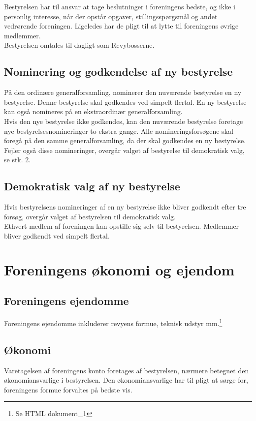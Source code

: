 \documentclass[a4paper,11pt,danish]{article}
\begin{document}
\noindent Bestyrelsen har til ansvar at tage beslutninger i foreningens bedste,
og ikke i personlig interesse, når der opstår opgaver, stillingsspørgsmål og
andet vedrørende foreningen. Ligeledes har de pligt til at lytte til foreningens
øvrige medlemmer.\\

\noindent Bestyrelsen omtales til dagligt som Revybosserne.

\subsection{Nominering og godkendelse af ny bestyrelse}
På den ordinære generalforsamling, nominerer den nuværende bestyrelse en ny
bestyrelse.  Denne bestyrelse skal godkendes ved simpelt flertal.  En ny
bestyrelse kan også nomineres på en ekstraordinær generalforsamling.\\

\noindent Hvis den nye bestyrelse ikke godkendes, kan den nuværende bestyrelse
foretage nye bestyrelsesnomineringer to ekstra gange.  Alle nomineringsforsøgene
skal foregå på den samme generalforsamling, da der skal godkendes en ny
bestyrelse. Fejler også disse nomineringer, overgår valget af bestyrelse til
demokratisk valg, se stk. 2.

\subsection{Demokratisk valg af ny bestyrelse}
Hvis bestyrelsens nomineringer af en ny bestyrelse ikke bliver godkendt efter
tre forsøg, overgår valget af bestyrelsen til demokratisk valg.\\

\noindent Ethvert medlem af foreningen kan opstille sig selv til bestyrelsen.
Medlemmer bliver godkendt ved simpelt flertal.

\section{Foreningens økonomi og ejendom}
\subsection{Foreningens ejendomme}
Foreningens ejendomme inkluderer revyens formue, teknisk udstyr
mm.\footnote{Se HTML dokument\_1}

\subsection{Økonomi}
Varetagelsen af foreningens konto foretages af bestyrelsen, nærmere betegnet den
økonomiansvarlige i bestyrelsen. Den økonomiansvarlige har til pligt at sørge
for, foreningens formue forvaltes på bedste vis.\\
\end{document}
